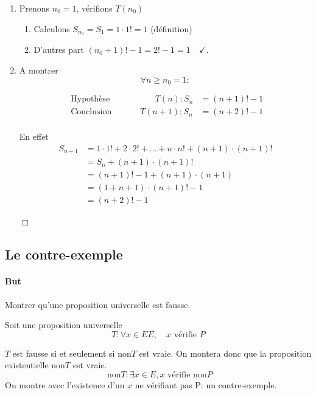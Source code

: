 \documentclass[
    11pt,
    a4paper,
    oneside,
    headinlcude, footinclude,
    twoside,
]{report}
\newcommand{\cqfd}[0]{\begin{flushright}$\Box$\end{flushright}}
\begin{document}
\begin{enumerate}
    \item Prenons $n_{0} = 1$, vérifions $T(n_{0})$ 

        \begin{enumerate}
            \item Calculons $S_{n_{0}} = S_{1} = 1 \cdot 1 ! = 1$  (définition)
            \item D'autres part $(n_{0} + 1)! -1 = 2! -1 = 1 \quad \checkmark.$
        \end{enumerate}
    \item  A montrer $$\forall n \geq n_{0} = 1:$$

        \[
            \begin{split}
                \text{ Hypothèse } \quad \quad \quad \quad \quad T(n) : S_{n} &= (n+1) ! - 1\\
                \text{ Conclusion } \quad \quad \quad T(n+1) : S_{n} &= (n+2) ! - 1\\
            \end{split}
        \]

        En effet
        \[
            \begin{split}
                S_{n+1} &= 1\cdot 1 ! + 2 \cdot 2 ! + ... + n\cdot n! + (n+1)\cdot(n+1)!\\
                &= S_{n} + (n+1)\cdot (n+1)!\\
                &= (n+1)! - 1 + (n+1)\cdot(n+1) \\
                &= (1+n+1)\cdot(n+1)!-1\\
                &= (n+2)! -1
            \end{split}
        \]
        \cqfd
\end{enumerate}


\subsection{Le contre-exemple}
\label{sub:le_conte_exemple}

\paragraph{But}

Montrer qu'une proposition universelle est fausse.

Soit une proposition universelle $$T: \forall x \in E E, \quad x \text{ vérifie } P$$

$T$ est fausse si et seulement si non$T$ est vraie. On montera donc que la
proposition existentielle non$T$ est vraie. $$ \text{ non}T: \exists x \in E,
x \text{ vérifie non}P $$ On montre avec l'existence d'un $x$ ne vérifiant pas
P: un contre-exemple.
\end{document}
